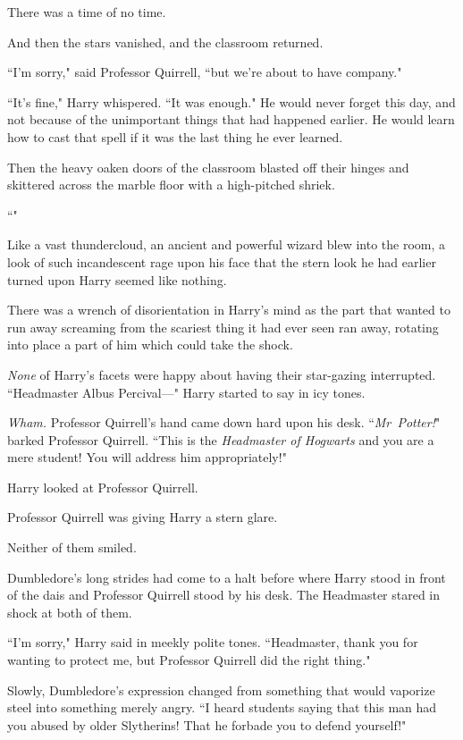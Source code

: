 There was a time of no time.

And then the stars vanished, and the classroom returned.

``I'm sorry," said Professor Quirrell, ``but we're about to have company."

``It's fine," Harry whispered. ``It was enough." He would never forget this day, and not because of the unimportant things that had happened earlier. He would learn how to cast that spell if it was the last thing he ever learned.

Then the heavy oaken doors of the classroom blasted off their hinges and skittered across the marble floor with a high-pitched shriek.

``"

Like a vast thundercloud, an ancient and powerful wizard blew into the room, a look of such incandescent rage upon his face that the stern look he had earlier turned upon Harry seemed like nothing.

There was a wrench of disorientation in Harry's mind as the part that wanted to run away screaming from the scariest thing it had ever seen ran away, rotating into place a part of him which could take the shock.

\emph{None} of Harry's facets were happy about having their star-gazing interrupted. ``Headmaster Albus Percival—" Harry started to say in icy tones.

\emph{Wham.} Professor Quirrell's hand came down hard upon his desk. ``\emph{Mr~Potter!}" barked Professor Quirrell. ``This is the \emph{Headmaster of Hogwarts} and you are a mere student! You will address him appropriately!"

Harry looked at Professor Quirrell.

Professor Quirrell was giving Harry a stern glare.

Neither of them smiled.

Dumbledore's long strides had come to a halt before where Harry stood in front of the dais and Professor Quirrell stood by his desk. The Headmaster stared in shock at both of them.

``I'm sorry," Harry said in meekly polite tones. ``Headmaster, thank you for wanting to protect me, but Professor Quirrell did the right thing."

Slowly, Dumbledore's expression changed from something that would vaporize steel into something merely angry. ``I heard students saying that this man had you abused by older Slytherins! That he forbade you to defend yourself!"

